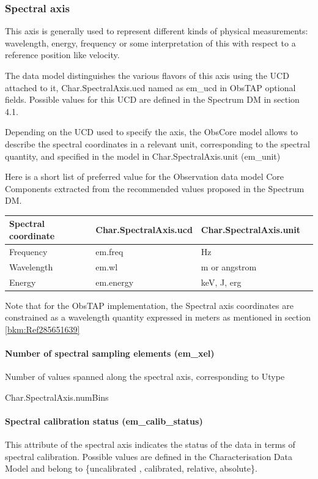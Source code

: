 \documentclass[11pt,a4paper]{ivoa}
\begin{document}
\subsubsection{Spectral axis}
This axis is generally used to represent different kinds of physical measurements: wavelength, energy, frequency or some
interpretation of this with respect to a reference position like velocity.

The data model distinguishes the various flavors of this axis using the UCD attached to it, Char.SpectralAxis.ucd named
as em\_ucd in ObsTAP optional fields.  Possible values for this UCD are defined in the Spectrum DM
\citep{2011ivoa.spec.1120M} in section 4.1. 

Depending on the UCD used to specify the axis, the ObsCore model allows to describe the spectral coordinates in a
relevant unit, corresponding to the spectral quantity, and specified in the model in Char.SpectralAxis.unit (em\_unit)

Here is a short list of preferred value for the Observation data model Core Components extracted from the recommended
values proposed in the Spectrum DM. 

\begin{tabular}{|l|p{}|p{}|p{}|}
\hline
Spectral coordinate & Char.SpectralAxis.ucd & Char.SpectralAxis.unit\\\hline
Frequency & em.freq & Hz\\\hline 
Wavelength & em.wl & m or angstrom\\\hline
Energy & em.energy & keV, J, erg\\\hline
\end{tabular}
Note that for the ObsTAP implementation, the Spectral axis coordinates are constrained as a wavelength quantity
expressed in meters as mentioned in section \ref{bkm:Ref285651639}

\paragraph[Number of spectral sampling elements (em\_xel)]{Number of spectral sampling elements (em\_xel)}
Number of values spanned along the spectral axis, corresponding to Utype

Char.SpectralAxis.numBins 

\paragraph[Spectral calibration status (em\_calib\_status)]{Spectral calibration status (em\_calib\_status)}
This attribute of the spectral axis indicates the status of the data in terms of spectral calibration. Possible values
are defined in the Characterisation Data Model and belong to \{uncalibrated , calibrated,  relative, absolute\}.
\end{document}
